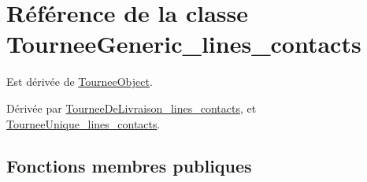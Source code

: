 \hypertarget{classTourneeGeneric__lines__contacts}{}\section{Référence de la classe Tournee\+Generic\+\_\+lines\+\_\+contacts}
\label{classTourneeGeneric__lines__contacts}


Est dérivée de \hyperlink{classTourneeObject}{Tournee\+Object}.



Dérivée par \hyperlink{classTourneeDeLivraison__lines__contacts}{Tournee\+De\+Livraison\+\_\+lines\+\_\+contacts}, et \hyperlink{classTourneeUnique__lines__contacts}{Tournee\+Unique\+\_\+lines\+\_\+contacts}.

\subsection*{Fonctions membres publiques}
